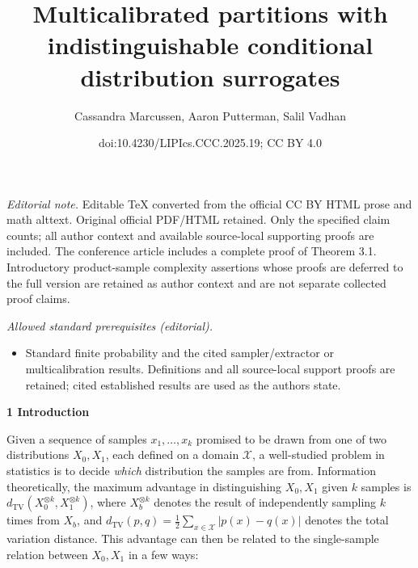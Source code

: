 \documentclass[10pt,a4paper]{article}
\title{Multicalibrated partitions with indistinguishable conditional distribution surrogates}
\author{Cassandra Marcussen, Aaron Putterman, Salil Vadhan}
\date{doi:10.4230/LIPIcs.CCC.2025.19; CC BY 4.0}
\begin{document}
\maketitle
\noindent\textit{Editorial note.} Editable TeX converted from the official CC BY HTML prose and math alttext. Original official PDF/HTML retained. Only the specified claim counts; all author context and available source-local supporting proofs are included. The conference article includes a complete proof of Theorem 3.1. Introductory product-sample complexity assertions whose proofs are deferred to the full version are retained as author context and are not separate collected proof claims.\par\medskip
\noindent\textit{Allowed standard prerequisites (editorial).}\begin{itemize}
\item Standard finite probability and the cited sampler/extractor or multicalibration results. Definitions and all source-local support proofs are retained; cited established results are used as the authors state.
\end{itemize}\medskip


\par\medskip\noindent\textbf{
1 Introduction}\par




Given a sequence of samples $x_{1},\dots,x_{k}$ promised to be drawn from one of two distributions $X_{0},X_{1}$, each defined on a domain $\mathcal{X}$, a well-studied problem in statistics is to decide \emph{which} distribution the samples are from.
Information theoretically, the maximum advantage in distinguishing $X_{0},X_{1}$ given $k$ samples is $d_{\mathrm{TV}}(X_{0}^{\otimes k},X_{1}^{\otimes k})$, where $X_{b}^{\otimes k}$ denotes the result of independently sampling $k$ times from $X_{b}$, and $d_{\mathrm{TV}}(p,q)=\frac{1}{2}\sum_{x\in\mathcal{X}}|p(x)-q(x)|$ denotes the total variation distance. This advantage can then be related to the single-sample relation between $X_{0},X_{1}$ in a few ways:\par
\end{document}
